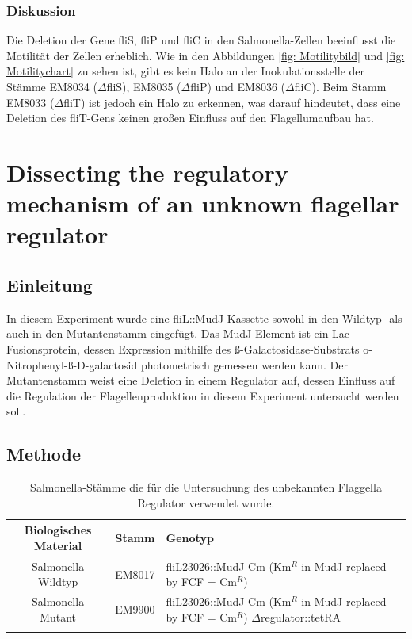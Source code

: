 \documentclass[oneside,10pt,a4paper]{report}
\begin{document}
			\subsection{Diskussion}
			Die Deletion der Gene fliS, fliP und fliC in den Salmonella-Zellen beeinflusst die Motilität der Zellen erheblich. Wie in den Abbildungen \ref{fig: Motilitybild} und \ref{fig: Motilitychart} zu sehen ist, gibt es kein Halo an der Inokulationsstelle der Stämme EM8034 ($\Delta$fliS), EM8035 ($\Delta$fliP) und EM8036 ($\Delta$fliC). Beim Stamm EM8033 ($\Delta$fliT) ist jedoch ein Halo zu erkennen, was darauf hindeutet, dass eine Deletion des fliT-Gens keinen großen Einfluss auf den Flagellumaufbau hat.
		
	\chapter{Dissecting the regulatory mechanism of an unknown flagellar regulator}
		\section{Einleitung}
		In diesem Experiment wurde eine fliL::MudJ-Kassette sowohl in den Wildtyp- als auch in den Mutantenstamm eingefügt. Das MudJ-Element ist ein Lac-Fusionsprotein, dessen Expression mithilfe des ß-Galactosidase-Substrats o-Nitrophenyl-ß-D-galactosid photometrisch gemessen werden kann.
		Der Mutantenstamm weist eine Deletion in einem Regulator auf, dessen Einfluss auf die Regulation der Flagellenproduktion in diesem Experiment untersucht werden soll.
		
		\section{Methode}
			\begin{table}[H]
			\centering
			\caption{Salmonella-Stämme die für die Untersuchung des unbekannten Flaggella Regulator verwendet wurde.}
			\label{tab: exp8-biologisches Material}
			\begin{tabular}{ccp{5cm}}
				\toprule
				Biologisches Material& Stamm & Genotyp\\
				\midrule
				\multirow{3}{*}{\parbox[t]{2cm}{Salmonella Wildtyp }}  & \multirow{3}{*}{EM8017} & \multirow{3}{*}{\parbox[t]{5cm}{fliL23026::MudJ-Cm (Km$^R$ in MudJ replaced by FCF = Cm$^R$)}}\\
				&&\\
				&&\\
				\multirow{3}{*}{\parbox[t]{2cm}{Salmonella Mutant}}  & \multirow{3}{*}{EM9900} & \multirow{3}{*}{\parbox[t]{5cm}{fliL23026::MudJ-Cm (Km$^R$ in MudJ replaced by FCF = Cm$^R$) $\Delta$regulator::tetRA}}\\
				&&\\
				&&\\
				&&\\
				\bottomrule			
			\end{tabular}
		\end{table}
		
\end{document}
